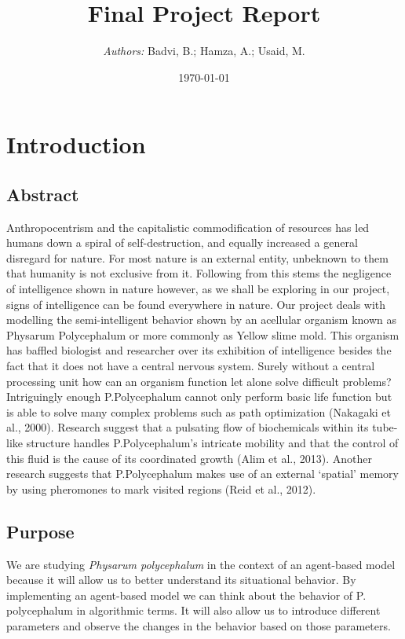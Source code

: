 \documentclass[a4paper, 11pt]{article}
\institute{\huge{Habib University}}
\title{Final Project Report}
\author{\Large{\textit{Authors: } Badvi, B.; Hamza, A.; Usaid, M.}}
\date{\today}
\begin{document}
\maketitle
\newpage
\tableofcontents
\newpage
\section {Introduction}
\subsection{Abstract}
Anthropocentrism and the capitalistic commodification of resources has led humans down a spiral of self-destruction, and equally increased a general disregard for nature. For most nature is an external entity, unbeknown to them that humanity is not exclusive from it. Following from this stems the negligence of intelligence shown in nature however, as we shall be exploring in our project, signs of intelligence can be found everywhere in nature. Our project deals with modelling the semi-intelligent behavior shown by an acellular organism known as Physarum Polycephalum or more commonly as Yellow slime mold. This organism has baffled biologist and researcher over its exhibition of intelligence besides the fact that it does not have a central nervous system. Surely without a central processing unit how can an organism function let alone solve difficult problems? Intriguingly enough P.Polycephalum cannot only perform basic life function but is able to solve many complex problems such as path optimization (Nakagaki et al., 2000). Research suggest that a pulsating flow of biochemicals within its tube-like structure handles P.Polycephalum’s intricate mobility and that the control of this fluid is the cause of its coordinated growth (Alim et al., 2013). Another research suggests that P.Polycephalum makes use of an external ‘spatial’ memory by using pheromones to mark visited regions (Reid et al., 2012).

\subsection{Purpose}
We are studying \textit{Physarum polycephalum} in the context of an agent-based model because it will allow us to better understand its situational behavior. By implementing an agent-based model we can think about the behavior of P. polycephalum in algorithmic terms. It will also allow us to introduce different parameters and observe the changes in the behavior based on those parameters.
\end{document}
